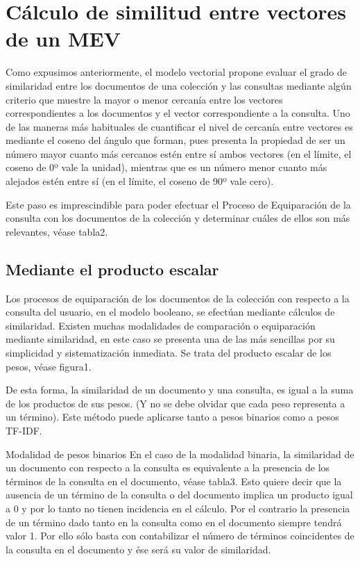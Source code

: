 \documentclass{article}
\begin{document}
\section{Cálculo de similitud entre vectores de un MEV}

Como expusimos anteriormente, el modelo vectorial propone evaluar el grado de similaridad entre los documentos de una colección y las consultas mediante algún criterio que muestre la mayor o menor cercanía entre los vectores correspondientes a los documentos y el vector correspondiente a la consulta. Uno de las maneras más habituales de cuantificar el nivel de cercanía entre vectores es mediante el coseno del ángulo que forman, pues presenta la propiedad de ser un número mayor cuanto más cercanos estén entre sí ambos vectores (en el límite, el coseno de 0º vale la unidad), mientras que es un número menor cuanto más alejados estén entre sí (en el límite, el coseno de 90º vale cero).

Este paso es imprescindible para poder efectuar el Proceso de Equiparación de la consulta con los documentos de la colección y determinar cuáles de ellos son más relevantes, véase tabla2.

\subsection{Mediante el producto escalar}

Los procesos de equiparación de los documentos de la colección con respecto a la consulta del usuario, en el modelo booleano, se efectúan mediante cálculos de similaridad. Existen muchas modalidades de comparación o equiparación mediante similaridad, en este caso se presenta una de las más sencillas por su simplicidad y sistematización inmediata. Se trata del producto escalar de los pesos, véase figura1. 

De esta forma, la similaridad de un documento y una consulta, es igual a la suma de los productos de sus pesos. (Y no se debe olvidar que cada peso representa a un término). Este método puede aplicarse tanto a pesos binarios como a pesos TF-IDF.

Modalidad de pesos binarios
En el caso de la modalidad binaria, la similaridad de un documento con respecto a la consulta es equivalente a la presencia de los términos de la consulta en el documento, véase tabla3. Esto quiere decir que la ausencia de un término de la consulta o del documento implica un producto igual a 0 y por lo tanto no tienen incidencia en el cálculo. Por el contrario la presencia de un término dado tanto en la consulta como en el documento siempre tendrá valor 1. Por ello sólo basta con contabilizar el número de términos coincidentes de la consulta en el documento y ése será su valor de similaridad.
\end{document}
